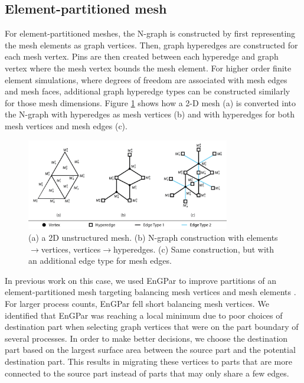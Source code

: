 \documentclass[conference]{IEEEtran}
\begin{document}
\subsection{Element-partitioned mesh}

For element-partitioned meshes, the N-graph is constructed by first representing the mesh elements
as graph vertices. Then, graph hyperedges are constructed for each mesh vertex. Pins
are then created between each hyperedge and graph vertex where the mesh vertex bounds the
mesh element. For higher order finite element simulations, where degrees of freedom are
associated with mesh edges and mesh faces, additional graph hyperedge types can be constructed
similarly for those mesh dimensions. Figure \ref{fig:mesh2graph} shows how a 2-D mesh (a)
is converted into the N-graph with hyperedges as mesh vertices (b) and with hyperedges for
both mesh vertices and mesh edges (c).

\begin{figure}[!ht]
  \centering
  \includegraphics[width=3.5in]{../figures/exampleMesh2Graph.png}
  \caption{(a) a 2D unstructured mesh. (b) N-graph construction with elements$\rightarrow$vertices, vertices$\rightarrow$hyperedges. (c) Same construction, but with an additional edge type for mesh edges.}
  \label{fig:mesh2graph}
\end{figure}

In previous work on this case, we used EnGPar to improve partitions of an
element-partitioned mesh targeting balancing mesh vertices and mesh elements \cite{engparSC17}.
For larger process counts, EnGPar fell short balancing mesh vertices.
We identified that EnGPar was reaching a local minimum due to poor choices of destination part
when selecting graph vertices that were on the part boundary of several processes. In order
to make better decisions, we choose the destination part based on the largest surface area
between the source part and the potential destination part. This results in migrating these
vertices to parts that are more connected to the source part instead of parts that may only
share a few edges.
\end{document}
